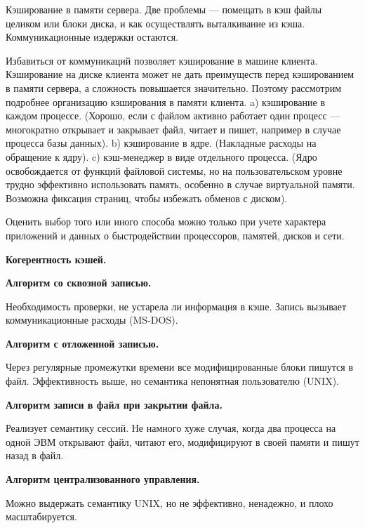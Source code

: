 Кэширование в памяти сервера.
Две проблемы --- помещать в кэш файлы целиком или блоки диска, и как осуществлять выталкивание из кэша.
Коммуникационные издержки остаются.

Избавиться от коммуникаций позволяет кэширование в машине клиента.
Кэширование на диске клиента может не дать преимуществ перед кэшированием в памяти сервера, а сложность повышается значительно.
Поэтому рассмотрим подробнее организацию кэширования в памяти клиента.
a) кэширование в каждом процессе. (Хорошо, если с файлом активно работает один процесс --- многократно открывает и закрывает файл, читает и пишет, например в случае процесса базы данных).
b) кэширование в ядре. (Накладные расходы на обращение к ядру).
c) кэш-менеджер в виде отдельного процесса. (Ядро освобождается от функций файловой системы, но на пользовательском уровне трудно эффективно использовать память, особенно в случае виртуальной памяти. Возможна фиксация страниц, чтобы избежать обменов с диском).

Оценить выбор того или иного способа можно только при учете характера приложений и данных о быстродействии процессоров, памятей, дисков и сети.

\textbf{Когерентность кэшей.}

\textbf{Алгоритм со сквозной записью.}

Необходимость проверки, не устарела ли информация в кэше.
Запись вызывает коммуникационные расходы (MS-DOS).

\textbf{Алгоритм с отложенной записью.}

Через регулярные промежутки времени все модифицированные блоки пишутся в файл.
Эффективность выше, но семантика непонятная пользователю (UNIX).

\textbf{Алгоритм записи в файл при закрытии файла.}

Реализует семантику сессий.
Не намного хуже случая, когда два процесса на одной ЭВМ открывают файл, читают
его, модифицируют в своей памяти и пишут назад в файл.

\textbf{Алгоритм централизованного управления.}

Можно выдержать семантику UNIX, но не эффективно, ненадежно, и плохо масштабируется.

